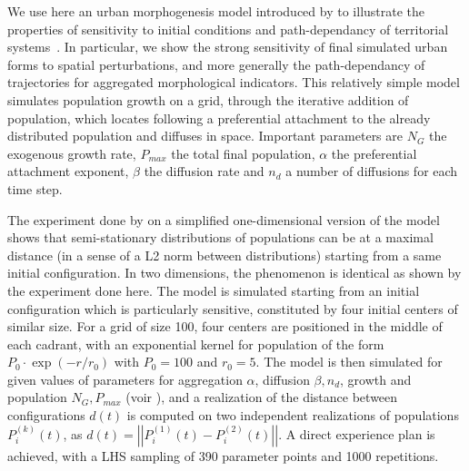 \documentclass[fleqn,10pt]{wlscirep}
\begin{document}


We use here an urban morphogenesis model introduced by \cite{raimbault2018calibration} to illustrate the properties of sensitivity to initial conditions and path-dependancy of territorial systems~\cite{pumain2012urban}. In particular, we show the strong sensitivity of final simulated urban forms to spatial perturbations, and more generally the path-dependancy of trajectories for aggregated morphological indicators. This relatively simple model simulates population growth on a grid, through the iterative addition of population, which locates following a preferential attachment to the already distributed population and diffuses in space. Important parameters are $N_G$ the exogenous growth rate, $P_{max}$ the total final population, $\alpha$ the preferential attachment exponent, $\beta$ the diffusion rate and $n_d$ a number of diffusions for each time step.


The experiment done by \cite{raimbault2018calibration} on a simplified one-dimensional version of the model shows that semi-stationary distributions of populations can be at a maximal distance (in a sense of a L2 norm between distributions) starting from a same initial configuration. In two dimensions, the phenomenon is identical as shown by the experiment done here. The model is simulated starting from an initial configuration which is particularly sensitive, constituted by four initial centers of similar size. For a grid of size 100, four centers are positioned in the middle of each cadrant, with an exponential kernel for population of the form $P_0 \cdot \exp \left(-r/r_0\right)$ with $P_0 = 100$ and $r_0 = 5$. The model is then simulated for given values of parameters for aggregation $\alpha$, diffusion $\beta, n_d$, growth and population $N_G, P_{max}$ (voir \cite{raimbault2018calibration}), and a realization of the distance between configurations $d(t)$ is computed on two independent realizations of populations $P^{(k)}_i(t)$, as $d(t)=\left|\left|P^{(1)}_i(t) - P^{(2)}_i(t)\right|\right|$. A direct experience plan is achieved, with a LHS sampling of 390 parameter points and 1000 repetitions.
\end{document}

